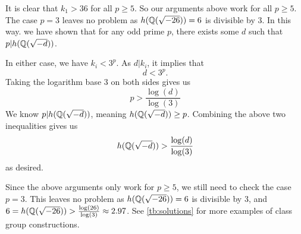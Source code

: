 It is clear that $k_1 > 36$ for all $p \geq 5$. 
So our arguments above work for all $p \geq 5$.
The case $p=3$ leaves no problem as $h(\mathbb{Q}(\sqrt{-26})) = 6$ is divisible by 3.
In this way. we have shown that for any odd prime $p$, there exists some $d$ such that $p | h(\mathbb{Q}(\sqrt{-d}))$.

In either case, we have $k_i < 3 ^p $. 
As $d| k_i$, it implies that 
$$
d < 3^p.
$$
Taking the logarithm base 3 on both sides gives us
$$
p > \frac{\log(d)}{\log(3)} 
$$
We know $p | h(\mathbb{Q}(\sqrt{-d}))$, meaning $h(\mathbb{Q}(\sqrt{-d})) \geq p$. Combining the above two inequalities gives us
$$
h(\mathbb{Q}(\sqrt{-d})) > \frac{\log(d)}{\log(3)}
$$
as desired.

Since the above arguments only work for $p \geq 5$, we still need to check the case $p = 3$.
This leaves no problem as $h(\mathbb{Q}(\sqrt{-26})) = 6$ is divisible by 3, and $6 = h(\mathbb{Q}(\sqrt{-26})) > \frac{\log(26)}{\log(3)} \approx 2.97$.
See \autoref{tb:solutions} for more examples of class group constructions.
